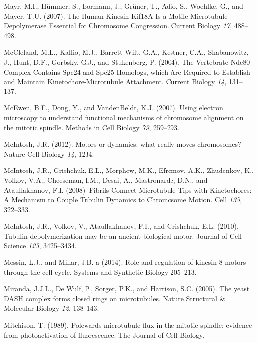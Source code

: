 \documentclass[12pt,a4paper,twoside,openright]{book}
\begin{document}
Mayr, M.I., Hümmer, S., Bormann, J., Grüner, T., Adio, S., Woehlke, G.,
and Mayer, T.U. (2007). The Human Kinesin Kif18A Is a Motile Microtubule
Depolymerase Essential for Chromosome Congression. Current Biology
\emph{17}, 488--498.

McCleland, M.L., Kallio, M.J., Barrett-Wilt, G.A., Kestner, C.A.,
Shabanowitz, J., Hunt, D.F., Gorbsky, G.J., and Stukenberg, P. (2004).
The Vertebrate Ndc80 Complex Contains Spc24 and Spc25 Homologs, which
Are Required to Establish and Maintain Kinetochore-Microtubule
Attachment. Current Biology \emph{14}, 131--137.

McEwen, B.F., Dong, Y., and VandenBeldt, K.J. (2007). Using electron
microscopy to understand functional mechanisms of chromosome alignment
on the mitotic spindle. Methods in Cell Biology \emph{79}, 259--293.

McIntosh, J.R. (2012). Motors or dynamics: what really moves
chromosomes? Nature Cell Biology \emph{14}, 1234.

McIntosh, J.R., Grishchuk, E.L., Morphew, M.K., Efremov, A.K.,
Zhudenkov, K., Volkov, V.A., Cheeseman, I.M., Desai, A., Mastronarde,
D.N., and Ataullakhanov, F.I. (2008). Fibrils Connect Microtubule Tips
with Kinetochores: A Mechanism to Couple Tubulin Dynamics to Chromosome
Motion. Cell \emph{135}, 322--333.

McIntosh, J.R., Volkov, V., Ataullakhanov, F.I., and Grishchuk, E.L.
(2010). Tubulin depolymerization may be an ancient biological motor.
Journal of Cell Science \emph{123}, 3425--3434.

Messin, L.J., and Millar, J.B. a (2014). Role and regulation of
kinesin-8 motors through the cell cycle. Systems and Synthetic Biology
205--213.

Miranda, J.J.L., De Wulf, P., Sorger, P.K., and Harrison, S.C. (2005).
The yeast DASH complex forms closed rings on microtubules. Nature
Structural \& Molecular Biology \emph{12}, 138--143.

Mitchison, T. (1989). Polewards microtubule flux in the mitotic spindle:
evidence from photoactivation of fluorescence. The Journal of Cell
Biology.
\end{document}
